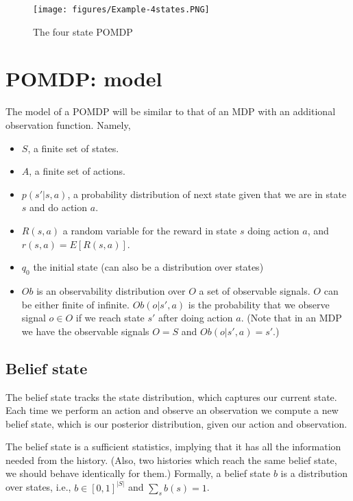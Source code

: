 \begin{figure}
  \begin{centering}
  \texttt{[image: figures/Example-4states.PNG]}\\
  \caption{The four state POMDP}\label{fig:Example-4states}
  \end{centering}
\end{figure}


\section{POMDP: model}

The model of a POMDP will be similar to that of an MDP with an
additional observation function. Namely,
\begin{itemize}
\item
$S$, a finite set of states.
\item
$A$, a finite set of actions.
\item
$p(s'|s,a)$, a probability distribution of next state given that we
are in state $s$ and do action $a$.
\item
$R(s,a)$ a random variable for the reward in state $s$ doing action
$a$, and $r(s,a)=E[R(s,a)]$.
\item
$q_0$ the initial state (can also be a distribution over states)
\item
$Ob$ is an observability distribution over $O$ a set of observable
signals. $O$ can be either finite of infinite. $Ob(o|s',a)$ is the
probability that we observe signal $o\in O$ if we reach state $s'$
after doing action $a$. (Note that in an MDP we have the observable
signals $O=S$ and $Ob(o|s',a)=s'$.)
\end{itemize}

\subsection{Belief state}

The belief state tracks the state distribution, which captures our
current state. Each time we perform an action and observe an
observation we compute a new belief state, which is our posterior
distribution, given our action and observation.

The belief state is a sufficient statistics, implying that it has
all the information needed from the history. (Also, two histories which reach the same belief state, we should behave identically for them.)
%
Formally, a belief state $b$ is a distribution over states, i.e.,
$b\in[0,1]^{|S|}$ and $\sum_s b(s)=1$.


